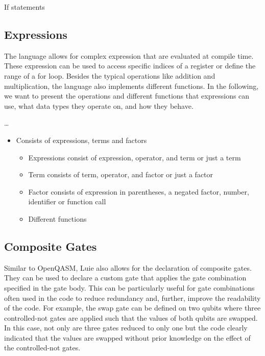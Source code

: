 If statements

\subsection{Expressions}
\label{sec:concept_expressions}
The language allows for complex expression that are evaluated at compile time. These expression can be used to access specific indices of a register or define the range of a for loop. Besides the typical operations like addition and multiplication, the language also implements different functions. In the following, we want to present the operations and different functions that expressions can use, what data types they operate on, and how they behave. 

\dots
\begin{itemize}
    \item Consists of expressions, terms and factors
    \begin{itemize}
        \item Expressions consist of expression, operator, and term or just a term
        \item Term consists of term, operator, and factor or just a factor
        \item Factor consists of expression in parentheses, a negated factor, number, identifier or function call
        \item Different functions
    \end{itemize}
\end{itemize}

\subsection{Composite Gates}
\label{sec:concept_compositeGates}
Similar to OpenQASM, Luie also allows for the declaration of composite gates. They can be used to declare a custom gate that applies the gate combination specified in the gate body. This can be particularly useful for gate combinations often used in the code to reduce redundancy and, further, improve the readability of the code. For example, the swap gate can be defined on two qubits where three controlled-not gates are applied such that the values of both qubits are swapped. In this case, not only are three gates reduced to only one but the code clearly indicated that the values are swapped without prior knowledge on the effect of the controlled-not gates.

